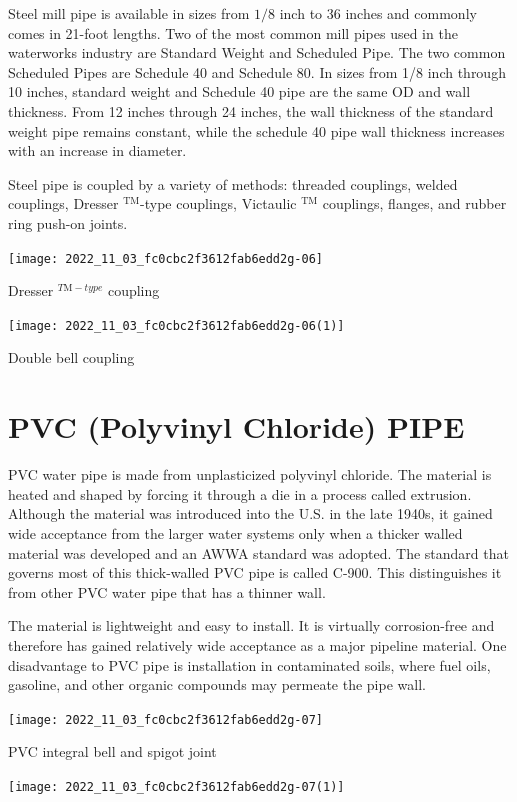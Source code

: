 \documentclass[10pt]{article}
\begin{document}
Steel mill pipe is available in sizes from $1 / 8$ inch to 36 inches and commonly comes in 21-foot lengths. Two of the most common mill pipes used in the waterworks industry are Standard Weight and Scheduled Pipe. The two common Scheduled Pipes are Schedule 40 and Schedule 80. In sizes from 1/8 inch through 10 inches, standard weight and Schedule 40 pipe are the same OD and wall thickness. From 12 inches through 24 inches, the wall thickness of the standard weight pipe remains constant, while the schedule 40 pipe wall thickness increases with an increase in diameter.

Steel pipe is coupled by a variety of methods: threaded couplings, welded couplings, Dresser ${ }^{\mathrm{TM}}$-type couplings, Victaulic ${ }^{\mathrm{TM}}$ couplings, flanges, and rubber ring push-on joints.

\texttt{[image: 2022\_11\_03\_fc0cbc2f3612fab6edd2g-06]}

Dresser ${ }^{T \mathrm{M}-t y p e}$ coupling

\texttt{[image: 2022\_11\_03\_fc0cbc2f3612fab6edd2g-06(1)]}

Double bell coupling

\section{PVC (Polyvinyl Chloride) PIPE}
PVC water pipe is made from unplasticized polyvinyl chloride. The material is heated and shaped by forcing it through a die in a process called extrusion. Although the material was introduced into the U.S. in the late 1940s, it gained wide acceptance from the larger water systems only when a thicker walled material was developed and an AWWA standard was adopted. The standard that governs most of this thick-walled PVC pipe is called C-900. This distinguishes it from other PVC water pipe that has a thinner wall.

The material is lightweight and easy to install. It is virtually corrosion-free and therefore has gained relatively wide acceptance as a major pipeline material. One disadvantage to PVC pipe is installation in contaminated soils, where fuel oils, gasoline, and other organic compounds may permeate the pipe wall.

\texttt{[image: 2022\_11\_03\_fc0cbc2f3612fab6edd2g-07]}

PVC integral bell and spigot joint

\texttt{[image: 2022\_11\_03\_fc0cbc2f3612fab6edd2g-07(1)]}
\end{document}
